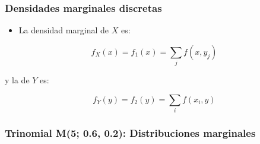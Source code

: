 \documentclass[
]{article}
\providecommand{\tightlist}{%
  \setlength{\itemsep}{0pt}\setlength{\parskip}{0pt}}
\begin{document}
\subsubsection{Densidades marginales discretas}\label{densidades-marginales-discretas}

\begin{itemize}
\tightlist
\item
  La densidad marginal de \(X\) es:
\end{itemize}

\[
f_X(x) = f_1(x) = \sum_j f(x, y_j)
\]

y la de \(Y\) es:

\[
f_Y(y) = f_2(y) = \sum_i f(x_i, y)
\]

\subsubsection{Trinomial M(5; 0.6, 0.2): Distribuciones marginales}\label{trinomial-m5-0.6-0.2-distribuciones-marginales}
\end{document}

